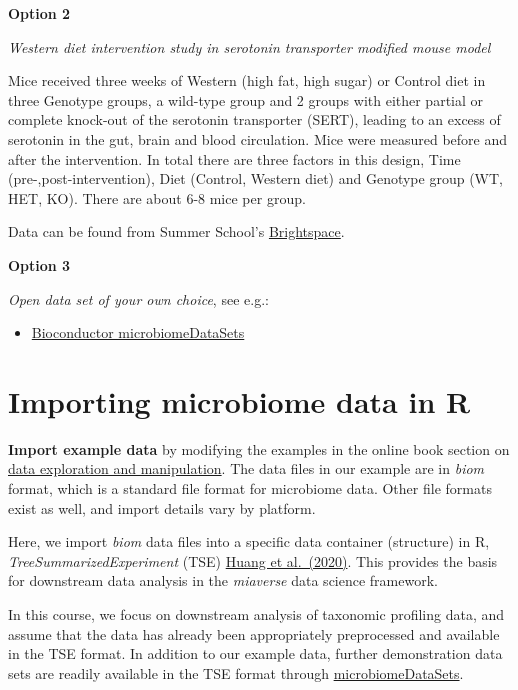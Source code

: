 \documentclass[
]{book}
\providecommand{\tightlist}{%
  \setlength{\itemsep}{0pt}\setlength{\parskip}{0pt}}
\begin{document}
\textbf{Option 2}

\emph{Western diet intervention study in serotonin transporter modified mouse model}

Mice received three weeks of Western (high fat, high sugar) or Control diet in
three Genotype groups, a wild-type group and 2 groups with either partial or
complete knock-out of the serotonin transporter (SERT), leading to an excess of
serotonin in the gut, brain and blood circulation. Mice were measured before
and after the intervention. In total there are three factors in this design,
Time (pre-,post-intervention), Diet (Control, Western diet) and Genotype group
(WT, HET, KO). There are about 6-8 mice per group.

Data can be found from Summer School's \href{https://brightspace.ru.nl/d2l/le/content/249077/Home}{Brightspace}.

\textbf{Option 3}

\emph{Open data set of your own choice}, see e.g.:

\begin{itemize}
\tightlist
\item
  \href{https://bioconductor.org/packages/release/data/experiment/html/microbiomeDataSets.html}{Bioconductor microbiomeDataSets}
\end{itemize}

\hypertarget{importing-microbiome-data-in-r}{%
\section{Importing microbiome data in R}\label{importing-microbiome-data-in-r}}

\textbf{Import example data} by modifying the examples in the online book
section on \href{https://microbiome.github.io/OMA/data-introduction.html\#loading-experimental-microbiome-data}{data exploration and
manipulation}. The
data files in our example are in \emph{biom} format, which is a standard
file format for microbiome data. Other file formats exist as well, and
import details vary by platform.

Here, we import \emph{biom} data files into a specific data container (structure)
in R, \emph{TreeSummarizedExperiment} (TSE) \href{https://f1000research.com/articles/9-1246}{Huang et
al.~(2020)}. This provides
the basis for downstream data analysis in the \emph{miaverse} data science
framework.

In this course, we focus on downstream analysis of taxonomic profiling
data, and assume that the data has already been appropriately
preprocessed and available in the TSE format. In addition to our
example data, further demonstration data sets are readily available in
the TSE format through
\href{https://bioconductor.org/packages/release/data/experiment/html/microbiomeDataSets.html}{microbiomeDataSets}.
\end{document}
